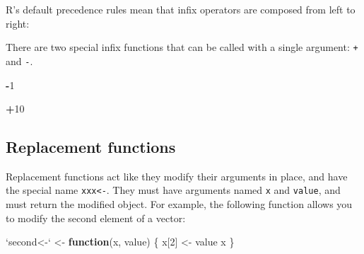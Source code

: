 \documentclass[]{book}
\newenvironment{Shaded}{\begin{snugshade}}{\end{snugshade}}
\newcommand{\KeywordTok}[1]{\textcolor[rgb]{0.13,0.29,0.53}{\textbf{#1}}}
\newcommand{\DataTypeTok}[1]{\textcolor[rgb]{0.13,0.29,0.53}{#1}}
\newcommand{\DecValTok}[1]{\textcolor[rgb]{0.00,0.00,0.81}{#1}}
\newcommand{\StringTok}[1]{\textcolor[rgb]{0.31,0.60,0.02}{#1}}
\newcommand{\ControlFlowTok}[1]{\textcolor[rgb]{0.13,0.29,0.53}{\textbf{#1}}}
\newcommand{\OperatorTok}[1]{\textcolor[rgb]{0.81,0.36,0.00}{\textbf{#1}}}
\newcommand{\NormalTok}[1]{#1}
\theoremstyle{definition}
\theoremstyle{definition}
\theoremstyle{definition}
\theoremstyle{remark}
\begin{document}
\begin{Shaded}
\end{Shaded}

R's default precedence rules mean that infix operators are composed from
left to right:

\begin{Shaded}
\end{Shaded}

There are two special infix functions that can be called with a single
argument: \texttt{+} and \texttt{-}.

\begin{Shaded}
\begin{Highlighting}[]
\OperatorTok{-}\DecValTok{1}
\end{Highlighting}
\end{Shaded}

\begin{Shaded}
\begin{Highlighting}[]
\OperatorTok{+}\DecValTok{10}
\end{Highlighting}
\end{Shaded}

\hypertarget{replacement-functions}{\subsection{Replacement
functions}\label{replacement-functions}}

Replacement functions act like they modify their arguments in place, and
have the special name \texttt{xxx\textless{}-}. They must have arguments
named \texttt{x} and \texttt{value}, and must return the modified
object. For example, the following function allows you to modify the
second element of a vector:

\begin{Shaded}
\begin{Highlighting}[]
\StringTok{`}\DataTypeTok{second<-}\StringTok{`}\NormalTok{ <-}\StringTok{ }\ControlFlowTok{function}\NormalTok{(x, value) \{}
\NormalTok{  x[}\DecValTok{2}\NormalTok{] <-}\StringTok{ }\NormalTok{value}
\NormalTok{  x}
\NormalTok{\}}
\end{Highlighting}
\end{Shaded}
\end{document}
